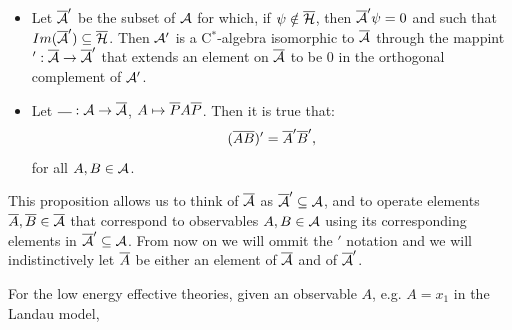 {\begin{itemize}
        \begin{proposition}
        \hfill
        \begin{itemize}
            
            \item Let $\overline{\mathcal A}'$ be the subset of $\mathcal A$ for which, if $\psi \notin \overline{\mathcal H}$, then $\overline{\mathcal A}' \psi = 0$ and such that $Im(\overline{\mathcal A}') \subseteq \overline{\mathcal H}$. Then $\mathcal A'$ is a C$^*$-algebra isomorphic to $\overline{\mathcal A}$ through the mappint $': \overline{\mathcal A} \to \overline{\mathcal A}'$ that extends an element on $\overline{\mathcal A}$ to be $0$ in the orthogonal complement of $\mathcal A'$.
            
            \item Let $\overline{\quad}: \mathcal A \to \overline{\mathcal A}$, $A \mapsto \overline{P} A \overline{P}$. Then it is true that:
            \begin{equation}
                (\overline{A} \overline{B})' = \overline{A}' \overline{B}',
            \end{equation}
            for all $A, B \in \mathcal A$.
            
        \end{itemize}
        \end{proposition}
        \begin{notation}
        This proposition allows us to think of $\overline{\mathcal A}$ as $\overline{\mathcal A}' \subseteq \mathcal A$, and to operate elements $\overline{A}, \overline{B} \in \overline{\mathcal A}$ that correspond to observables $A, B \in \mathcal A$ using its corresponding elements in $\overline{\mathcal A}' \subseteq \mathcal A$. From now on we will ommit the $'$ notation and we will indistinctively let $\cut A$ be either an element of $\overline{\mathcal A}$ and of $\overline{\mathcal A}'$.
        \end{notation}
         
        
        For the low energy effective theories, given an observable $A$, e.g. $A = x_1$ in the Landau model, \rtext{$\cut A$ will %
        be a first approximation of the corresponding observable}
        

\end{itemize}}
